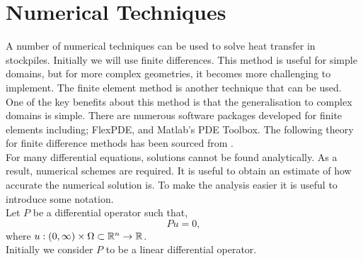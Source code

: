 \chapter{Numerical Techniques}
A number of numerical techniques can be used to solve heat transfer in stockpiles. Initially we will use finite differences. This method is useful for simple domains, but for more complex geometries, it becomes more challenging to implement. The finite element method is another technique that can be used. One of the key benefits about this method is that the generalisation to complex domains is simple. There are numerous software packages developed for finite elements including; FlexPDE, and Matlab's PDE Toolbox. 
The following theory for finite difference methods has been sourced from \cite{strik}.\\
For many differential equations, solutions cannot be found analytically. As a result, numerical schemes are required. It is useful to obtain an estimate of how accurate the numerical solution is. To make the analysis easier it is useful to introduce some notation.\\
Let $P$ be a differential operator such that,
\begin{equation}
Pu=0,\label{Diff_op}
\end{equation} 
where $u:(0,\infty)\times\Omega\subset\mathbb{R}^n\rightarrow \mathbb{R}$.\\
Initially we consider $P$ to be a linear differential operator.
